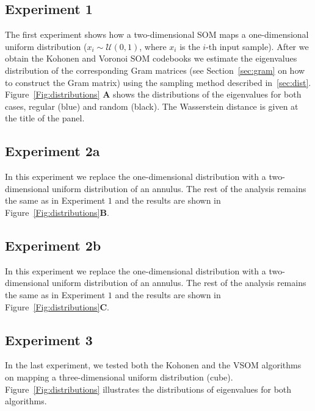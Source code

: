 \documentclass[10pt]{article}
\theoremstyle{definition}
\begin{document}
\subsection{Experiment 1}
The first experiment shows how a two-dimensional SOM maps a one-dimensional
uniform distribution ($x_i \sim \mathcal{U}(0, 1)$, where $x_i$ is the $i$-th
input sample). After we obtain the Kohonen and Voronoi SOM codebooks we
estimate the eigenvalues distribution of the corresponding Gram matrices (see
Section~\ref{sec:gram} on how to construct the Gram matrix) using the sampling
method described in~\ref{sec:dist}. Figure~\ref{Fig:distributions}{\bfseries
\sffamily A} shows the distributions of the eigenvalues for both cases, regular
(blue) and random (black). The Wasserstein distance is given at the title of
the panel.

\subsection{Experiment 2a}
In this experiment we replace the one-dimensional distribution with a
two-dimensional uniform distribution of an annulus. The rest of the analysis 
remains the same as in Experiment $1$ and the results are shown in
Figure~\ref{Fig:distributions}{\bfseries \sffamily B}.

\subsection{Experiment 2b}
In this experiment we replace the one-dimensional distribution with a
two-dimensional uniform distribution of an annulus. The rest of the analysis 
remains the same as in Experiment $1$ and the results are shown in
Figure~\ref{Fig:distributions}{\bfseries \sffamily C}.

\subsection{Experiment 3}
In the last experiment, we tested both the Kohonen and the VSOM algorithms 
on mapping a three-dimensional uniform distribution (cube). 
Figure~\ref{Fig:distributions}{\bfseries \sffamily} illustrates the 
distributions of eigenvalues for both algorithms.
\end{document}
